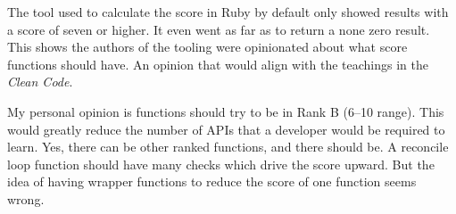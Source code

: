 The tool used to calculate the \cc score in Ruby by default only showed results with a score of seven or higher.
It even went as far as to return a none zero result.
This shows the authors of the tooling were opinionated about what score functions should have.
An opinion that would align with the teachings in the \textit{Clean Code}.

My personal opinion is functions should try to be in Rank B (6–10 range).
This would greatly reduce the number of APIs that a developer would be required to learn.
Yes, there can be other ranked functions, and there should be.
A reconcile loop function should have many checks which drive the \cc score upward.
But the idea of having wrapper functions to reduce the \cc score of one function seems wrong.
















